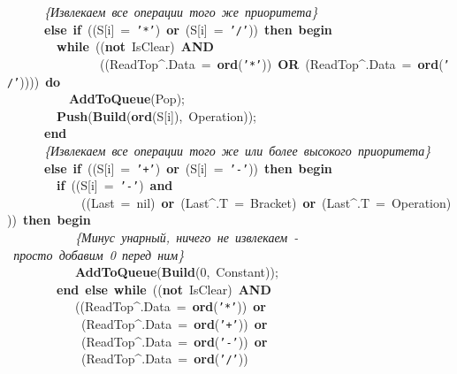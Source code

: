 \mbox{}\ \ \ \ \ \ \textit{\{Извлекаем\ все\ операции\ того\ же\ приоритета\}} \\
\mbox{}\ \ \ \ \ \ \textbf{else}\ \textbf{if}\ ((S[i]\ =\ \texttt{'*'})\ \textbf{or}\ (S[i]\ =\ \texttt{'/'}))\ \textbf{then}\ \textbf{begin} \\
\mbox{}\ \ \ \ \ \ \ \ \textbf{while}\ ((\textbf{not}\ IsClear)\ \textbf{AND}\  \\
\mbox{}\ \ \ \ \ \ \ \ \ \ \ \ \ \ \ ((ReadTop\textasciicircum{}.Data\ =\ \textbf{ord}(\texttt{'*'}))\ \textbf{OR}\ (ReadTop\textasciicircum{}.Data\ =\ \textbf{ord}(\texttt{'/'}))))\ \textbf{do} \\
\mbox{}\ \ \ \ \ \ \ \ \ \ \textbf{AddToQueue}(Pop); \\
\mbox{}\ \ \ \ \ \ \ \ \textbf{Push}(\textbf{Build}(\textbf{ord}(S[i]),\ Operation)); \\
\mbox{}\ \ \ \ \ \ \textbf{end} \\
\mbox{}\ \ \ \ \ \ \textit{\{Извлекаем\ все\ операции\ того\ же\ или\ более\ высокого\ приоритета\}} \\
\mbox{}\ \ \ \ \ \ \textbf{else}\ \textbf{if}\ ((S[i]\ =\ \texttt{'+'})\ \textbf{or}\ (S[i]\ =\ \texttt{'-'}))\ \textbf{then}\ \textbf{begin} \\
\mbox{}\ \ \ \ \ \ \ \ \textbf{if}\ ((S[i]\ =\ \texttt{'-'})\ \textbf{and}\  \\
\mbox{}\ \ \ \ \ \ \ \ \ \ \ \ ((Last\ =\ nil)\ \textbf{or}\ (Last\textasciicircum{}.T\ =\ Bracket)\ \textbf{or}\ (Last\textasciicircum{}.T\ =\ Operation)))\ \textbf{then}\ \textbf{begin} \\
\mbox{}\ \ \ \ \ \ \ \ \ \ \ \textit{\{Минус\ унарный,\ ничего\ не\ извлекаем\ -\ просто\ добавим\ 0\ перед\ ним\}} \\
\mbox{}\ \ \ \ \ \ \ \ \ \ \ \textbf{AddToQueue}(\textbf{Build}(0,\ Constant)); \\
\mbox{}\ \ \ \ \ \ \ \ \textbf{end}\ \textbf{else}\ \textbf{while}\ ((\textbf{not}\ IsClear)\ \textbf{AND} \\
\mbox{}\ \ \ \ \ \ \ \ \ \ \ ((ReadTop\textasciicircum{}.Data\ =\ \textbf{ord}(\texttt{'*'}))\ \textbf{or} \\
\mbox{}\ \ \ \ \ \ \ \ \ \ \ \ (ReadTop\textasciicircum{}.Data\ =\ \textbf{ord}(\texttt{'+'}))\ \textbf{or} \\
\mbox{}\ \ \ \ \ \ \ \ \ \ \ \ (ReadTop\textasciicircum{}.Data\ =\ \textbf{ord}(\texttt{'-'}))\ \textbf{or} \\
\mbox{}\ \ \ \ \ \ \ \ \ \ \ \ (ReadTop\textasciicircum{}.Data\ =\ \textbf{ord}(\texttt{'/'})) \\
